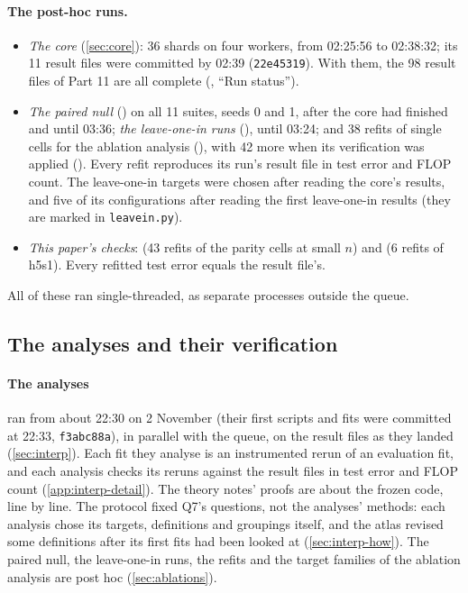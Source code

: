 \paragraph{The post-hoc runs.}
\begin{itemize}
\item \emph{The core} (\cref{sec:core}): 36 shards on four workers, from 02:25:56 to 02:38:32; its 11 result files were committed by 02:39 (\texttt{22e45319}). With them, the 98 result files of Part 11 are all complete (, ``Run status'').
\item \emph{The paired null} () on all 11 suites, seeds 0 and 1, after the core had finished and until 03:36; \emph{the leave-one-in runs} (), until 03:24; and 38 refits of single cells for the ablation analysis (), with 42 more when its verification was applied (). Every refit reproduces its run's result file in test error and FLOP count. The leave-one-in targets were chosen after reading the core's results, and five of its configurations after reading the first leave-one-in results (they are marked in \texttt{leavein.py}).
\item \emph{This paper's checks}:  (43 refits of the parity cells at small $n$) and  (6 refits of h5s1). Every refitted test error equals the result file's.
\end{itemize}
All of these ran single-threaded, as separate processes outside the queue.

\subsection{The analyses and their verification}\label{app:interp-workflow}

\paragraph{The analyses} ran from about 22:30 on 2 November (their first scripts and fits were committed at 22:33, \texttt{f3abc88a}), in parallel with the queue, on the result files as they landed (\cref{sec:interp}). Each fit they analyse is an instrumented rerun of an evaluation fit, and each analysis checks its reruns against the result files in test error and FLOP count (\cref{app:interp-detail}). The theory notes' proofs are about the frozen code, line by line. The protocol fixed Q7's questions, not the analyses' methods: each analysis chose its targets, definitions and groupings itself, and the atlas revised some definitions after its first fits had been looked at (\cref{sec:interp-how}). The paired null, the leave-one-in runs, the refits and the target families of the ablation analysis are post hoc (\cref{sec:ablations}).


